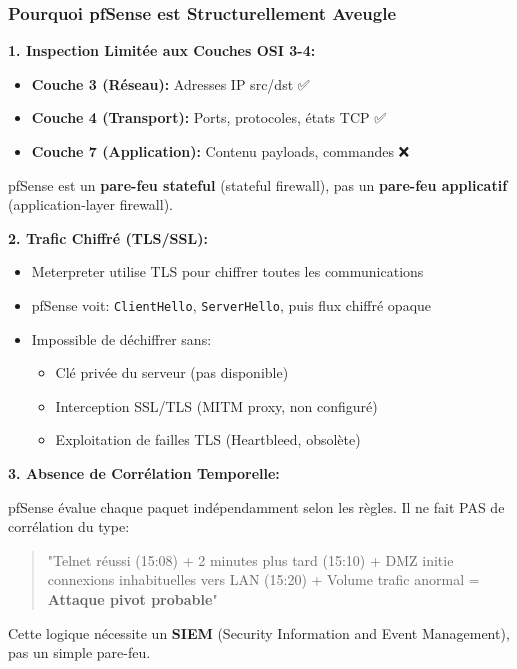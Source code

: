 \documentclass[12pt,a4paper,openany]{report}
\begin{document}
	\subsubsection{Pourquoi pfSense est Structurellement Aveugle}
	
	\textbf{1. Inspection Limitée aux Couches OSI 3-4:}
	
	\begin{itemize}
		\item \textbf{Couche 3 (Réseau):} Adresses IP src/dst ✅
		\item \textbf{Couche 4 (Transport):} Ports, protocoles, états TCP ✅
		\item \textbf{Couche 7 (Application):} Contenu payloads, commandes ❌
	\end{itemize}
	
	pfSense est un \textbf{pare-feu stateful} (stateful firewall), pas un 
	\textbf{pare-feu applicatif} (application-layer firewall).
	
	\textbf{2. Trafic Chiffré (TLS/SSL):}
	
	\begin{itemize}
		\item Meterpreter utilise TLS pour chiffrer toutes les communications
		\item pfSense voit: \texttt{ClientHello}, \texttt{ServerHello}, 
		puis flux chiffré opaque
		\item Impossible de déchiffrer sans:
		\begin{itemize}
			\item Clé privée du serveur (pas disponible)
			\item Interception SSL/TLS (MITM proxy, non configuré)
			\item Exploitation de failles TLS (Heartbleed, obsolète)
		\end{itemize}
	\end{itemize}
	
	\textbf{3. Absence de Corrélation Temporelle:}
	
	pfSense évalue chaque paquet indépendamment selon les règles. Il ne fait 
	PAS de corrélation du type:
	
	\begin{quote}
		"Telnet réussi (15:08) + 2 minutes plus tard (15:10) + DMZ initie connexions 
		inhabituelles vers LAN (15:20) + Volume trafic anormal = \textbf{Attaque pivot probable}"
	\end{quote}
	
	Cette logique nécessite un \textbf{SIEM} (Security Information and Event 
	Management), pas un simple pare-feu.
	
\end{document}
